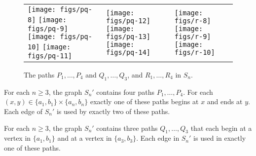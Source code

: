 \documentclass{patmorin}
\begin{document}
\begin{figure}
    \begin{center}
        \begin{tabularx}{\textwidth}{XXX}
        \texttt{[image: figs/pq-8]} \newline
        \texttt{[image: figs/pq-9]} \newline
        \texttt{[image: figs/pq-10]} \newline
        \texttt{[image: figs/pq-11]} &
        \texttt{[image: figs/pq-12]} \newline
        \texttt{[image: figs/pq-13]} \newline
        \texttt{[image: figs/pq-14]} &
        \texttt{[image: figs/r-8]} \newline
        \texttt{[image: figs/r-9]} \newline
        \texttt{[image: figs/r-10]}
        \end{tabularx}
    \end{center}
    \caption{The paths $P_1,\ldots,P_4$ and $Q_1,\ldots,Q_3$, and $R_1,\ldots,R_4$ in $S_n$.}
    \label{good_paths}
\end{figure}

\begin{lem}
    For each $n\ge 3$, the graph $S_n'$ contains four paths $P_1,\ldots,P_4$.  For each $(x,y)\in\{a_1,b_1\}\times\{a_n,b_n\}$ exactly one of these paths begins at $x$ and ends at $y$.  Each edge of $S_n'$ is used by exactly two of these paths.
\end{lem}

\begin{lem}
    For each $n\ge 3$, the graph $S_n'$ contains three paths $Q_1,\ldots,Q_3$ that each begin at a vertex in $\{a_1,b_1\}$ and at a vertex in $\{a_3,b_3\}$.  Each edge in $S_n'$ is used in exactly one of these paths.
\end{lem}
\end{document}
